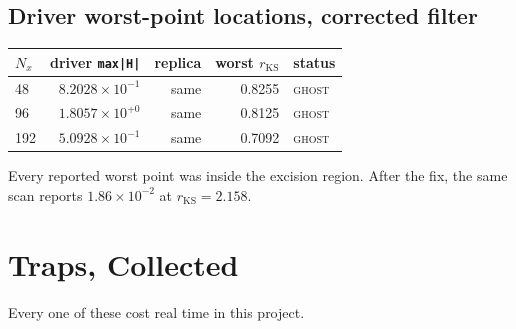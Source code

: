 \documentclass[11pt,openany]{book}
\begin{document}
\section{Driver worst-point locations, corrected filter}

\begin{center}
\begin{tabular}{@{}lrrrl@{}}
\toprule
$N_x$ & driver \texttt{max|H|} & replica & worst $r_{\mathrm{KS}}$ & status \\
\midrule
48  & $8.2028\times10^{-1}$ & same & 0.8255 & \textsc{ghost} \\
96  & $1.8057\times10^{+0}$ & same & 0.8125 & \textsc{ghost} \\
192 & $5.0928\times10^{-1}$ & same & 0.7092 & \textsc{ghost} \\
\bottomrule
\end{tabular}
\end{center}

Every reported worst point was inside the excision region. After the fix, the
same scan reports $1.86\times10^{-2}$ at $r_{\mathrm{KS}} = 2.158$.

\appendix
\chapter{Traps, Collected}
\label{app:traps}

Every one of these cost real time in this project.
\end{document}
